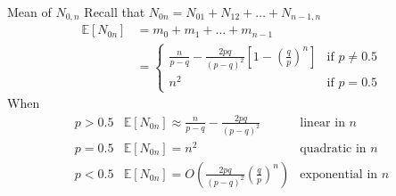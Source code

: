 \documentclass[letterpaper,handout, mathserif]{beamer}
\def\E{\mathbb E}
\begin{document}
\begin{frame}{Mean of $N_{0,n}$}
Recall that $N_{0n}=N_{01}+N_{12}+\ldots+N_{n-1,n}$
\begin{align*}
\E[N_{0n}]&=m_{0}+m_{1}+\ldots+m_{n-1}\\
&=\begin{cases}
\frac{n}{p-q}-\frac{2pq}{(p-q)^2}[1-(\frac{q}{p})^n] &\mbox{if } p\neq 0.5\\
n^2 & \mbox{if } p= 0.5
\end{cases}
\end{align*}
When
$$
\begin{array}{cll}
p>0.5& \E[N_{0n}]\approx \frac{n}{p-q}-\frac{2pq}{(p-q)^2} & \mbox{linear in }n\\[5pt]
p=0.5& \E[N_{0n}]= n^2 & \mbox{quadratic in }n\\[5pt]
p<0.5& \E[N_{0n}]=O(\frac{2pq}{(p-q)^2}(\frac{q}{p})^n) & \mbox{exponential in }n
\end{array}
$$
\end{frame}
\end{document}
